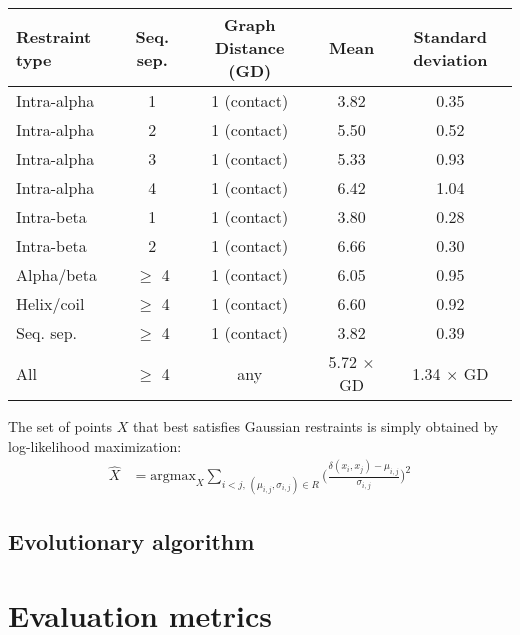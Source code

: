         \begin{table}[H]
            \centering
            \begin{tabular}{|l|c|c|c|c|}
                \hline
                Restraint type & Seq. sep. & Graph Distance (GD) & Mean & Standard deviation \\
                \hline
                \hline
                Intra-alpha & 1 & 1 (contact) & 3.82 & 0.35 \\
                Intra-alpha & 2 & 1 (contact) & 5.50 & 0.52 \\
                Intra-alpha & 3 & 1 (contact) & 5.33 & 0.93 \\
                Intra-alpha & 4 & 1 (contact) & 6.42 & 1.04 \\
                Intra-beta  & 1 & 1 (contact) & 3.80 & 0.28 \\
                Intra-beta  & 2 & 1 (contact) & 6.66 & 0.30 \\
                Alpha/beta  & $\ge$ 4 & 1 (contact) & 6.05 & 0.95 \\
                Helix/coil  & $\ge$ 4 & 1 (contact) & 6.60 & 0.92 \\
                Seq. sep.   & $\ge$ 4 & 1 (contact) & 3.82 & 0.39 \\
                All & $\ge$ 4 & any & 5.72 $\times$ GD & 1.34 $\times$ GD \\
                \hline
            \end{tabular}
            \label{restraints}
        \end{table}

        The set of points $X$ that best satisfies Gaussian restraints is simply
        obtained by log-likelihood maximization:
        \begin{align}
            \hat{X} & = \text{argmax}_{X} \sum\limits_{i < j ,\, (\mu_{i,j}, \sigma_{i,j}) \in R}
                \Bigg(\frac{\delta(x_i, x_j) - \mu_{i,j}}{\sigma_{i,j}}\Bigg)^2
        \end{align}

    \subsection{Evolutionary algorithm}


\section{Evaluation metrics}

